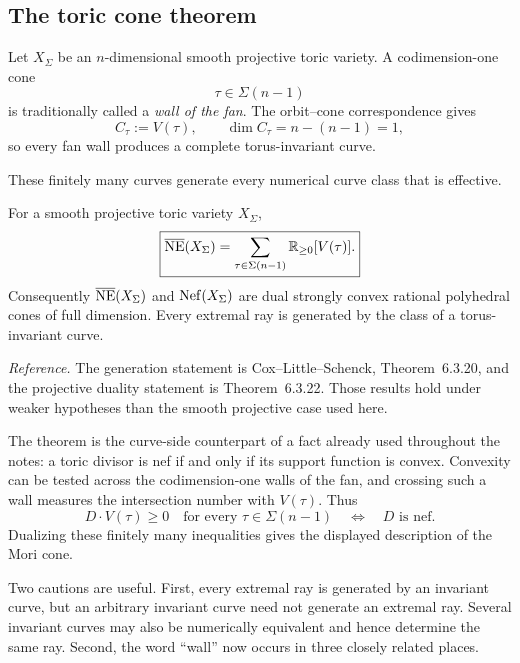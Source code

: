 \subsection{The toric cone theorem}

Let \(X_\Sigma\) be an \(n\)-dimensional smooth projective toric
variety.  A codimension-one cone
\[
\tau\in\Sigma(n-1)
\]
is traditionally called a \emph{wall of the fan}.  The orbit--cone
correspondence gives
\[
C_\tau:=V(\tau),
\qquad
\dim C_\tau=n-(n-1)=1,
\]
so every fan wall produces a complete torus-invariant curve.

These finitely many curves generate every numerical curve class that
is effective.

\begin{theorem}
\label{thm:toric-cone-theorem}
For a smooth projective toric variety \(X_\Sigma\),
\[
\boxed{
\overline{\operatorname{NE}}(X_\Sigma)
=
\sum_{\tau\in\Sigma(n-1)}
\mathbb{R}_{\geq0}[V(\tau)].}
\]
Consequently \(\overline{\operatorname{NE}}(X_\Sigma)\) and
\(\operatorname{Nef}(X_\Sigma)\) are dual strongly convex rational polyhedral
cones of full dimension.  Every extremal ray is generated by the
class of a torus-invariant curve.
\end{theorem}

\noindent
\textit{Reference.}
The generation statement is Cox--Little--Schenck,
Theorem~6.3.20, and the projective duality statement is
Theorem~6.3.22.  Those results hold under weaker hypotheses than the
smooth projective case used here.

The theorem is the curve-side counterpart of a fact already used
throughout the notes: a toric divisor is nef if and only if its support
function is convex.  Convexity can be tested across the codimension-one
walls of the fan, and crossing such a wall measures the intersection
number with \(V(\tau)\).  Thus
\[
D\cdot V(\tau)\geq0
\quad\text{for every }\tau\in\Sigma(n-1)
\quad\Longleftrightarrow\quad
D\text{ is nef}.
\]
Dualizing these finitely many inequalities gives the displayed
description of the Mori cone.

Two cautions are useful.
First, every extremal ray is generated by an invariant curve, but an
arbitrary invariant curve need not generate an extremal ray.  Several
invariant curves may also be numerically equivalent and hence
determine the same ray.  Second, the word ``wall'' now occurs in three
closely related places.

